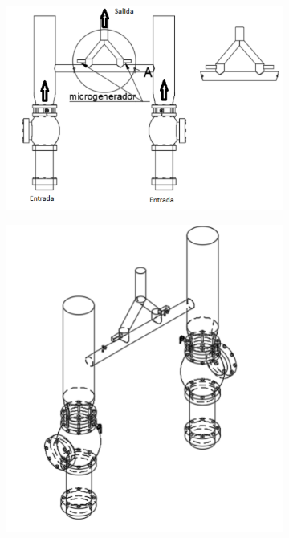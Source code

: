 \documentclass[11pt]{article}
\begin{document}
    \begin{figure}[htbp]
        \centering
        
        \begin{subfigure}{0.4\linewidth}
            \centering
            \includegraphics[width=\linewidth]{img/DisenoSub1.png}
        \end{subfigure}
        \begin{subfigure}{0.4\linewidth}
            \centering
            \includegraphics[width=\linewidth]{img/DisenoSun2.png}

\end{subfigure}
\end{figure}
\end{document}
